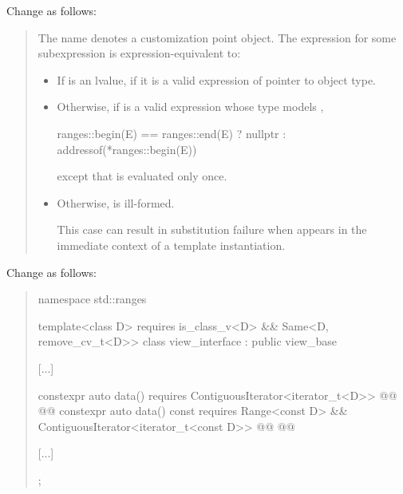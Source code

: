 Change  as follows:
\begin{quote}
\setcounter{Paras}{0}
\pnum
The name  denotes a customization point
object. The expression
 for some subexpression  is
expression-equivalent to:

\begin{itemize}
\item
  If  is an lvalue, 
  if it is a valid expression of pointer to object type.

\item
  Otherwise, if  is a valid expression whose type models
  , 
  \begin{removedblock}
  \begin{codeblock}
  ranges::begin(E) == ranges::end(E) ? nullptr : addressof(*ranges::begin(E))
  \end{codeblock}

  except that  is evaluated only once.
  \end{removedblock}

\item
  Otherwise,  is ill-formed.
  \begin{note}
  This case can result in substitution failure when 
  appears in the immediate context of a template instantiation.
  \end{note}
\end{itemize}
\end{quote}

Change  as follows:
\begin{quote}
\begin{codeblock}
namespace std::ranges {
  template<class D>
    requires is_class_v<D> && Same<D, remove_cv_t<D>>
  class view_interface : public view_base {
    [...]

    constexpr auto data() requires ContiguousIterator<iterator_t<D>> {
      @@
      @@
    }
    constexpr auto data() const
      requires Range<const D> && ContiguousIterator<iterator_t<const D>> {
        @@
        @@
      }

    [...]
  };
}
\end{codeblock}
\end{quote}
